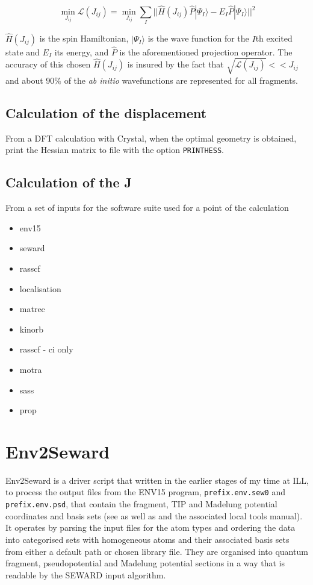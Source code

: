 \documentclass[10pt]{article}
\begin{document}
\begin{equation*}
	\min_{J_{ij}} \mathcal{L}(J_{ij}) = \min_{J_{ij}} \sum_I ||\hat{H}(J_{ij})\hat{P}|\Psi_I\rangle-E_I\hat{P}|\Psi_I\rangle||^2
\end{equation*}

$\hat{H}(J_{ij})$ is the spin Hamiltonian, $|\Psi_I\rangle$ is the wave function for the $I$th excited state and $E_I$ its energy, and $\hat{P}$ is the aforementioned projection operator. The accuracy of this chosen $\hat{H}(J_{ij})$ is insured by the fact that $\sqrt{\mathcal{L}(J_{ij})} << J_{ij}$ and about $90\%$ of the \textit{ab initio} wavefunctions are represented for all fragments. 

\subsection{Calculation of the displacement}
From a DFT calculation with Crystal, when the optimal geometry is obtained, print the Hessian matrix to file with the option \verb|PRINTHESS|.


\subsection{Calculation of the J}

From a set of inputs for the software suite used for a point of the calculation
\begin{itemize}
	\item env15
	\item seward
	\item rasscf
	\item localisation
	\item matrec
	\item kinorb
	\item rasscf - ci only
	\item motra
	\item sass
	\item prop
\end{itemize}

\section{Env2Seward}
Env2Seward is a driver script that written in the earlier stages of my time at ILL, to process the output files from the ENV15 program, \texttt{prefix.env.sew0} and \texttt{prefix.env.psd}, that contain the fragment, TIP and Madelung potential coordinates and basis sets (see \cite{varignon2013ab} as well as \cite{gelle2008fast} and the associated local tools manual). It operates by parsing the input files for the atom types and ordering the data into categorised sets with homogeneous atoms and their associated basis sets from either a default path or chosen library file. They are organised into quantum fragment, pseudopotential and Madelung potential sections in a way that is readable by the SEWARD input algorithm.



\end{document}
